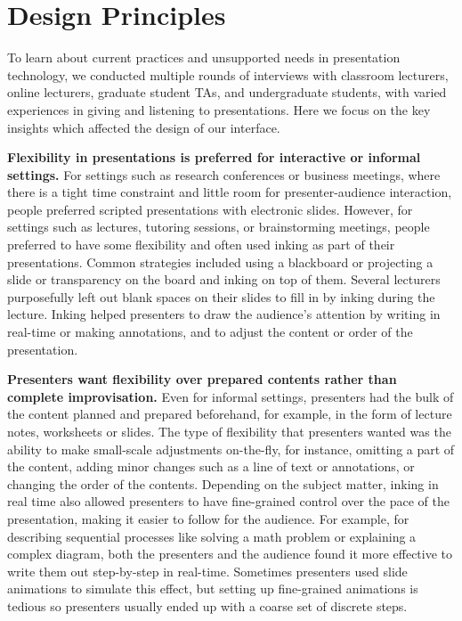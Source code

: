 \section{Design Principles}
To learn about current practices and unsupported needs in presentation technology, we conducted multiple rounds of interviews with classroom lecturers, online lecturers, graduate student TAs, and undergraduate students, with varied experiences in giving and listening to presentations.  Here we focus on the key insights which affected the design of our interface. 

\textbf{Flexibility in presentations is preferred for interactive or informal settings.} For settings such as research conferences or business meetings, where there is a tight time constraint and little room for presenter-audience interaction, people preferred scripted presentations with electronic slides. However, for settings such as lectures, tutoring sessions, or brainstorming meetings, people preferred to have some flexibility and often used inking as part of their presentations. Common strategies included using a blackboard or projecting a slide or transparency on the board and inking on top of them. Several lecturers purposefully left out blank spaces on their slides to fill in by inking during the lecture. Inking helped presenters to draw the audience's attention by  writing in real-time or making annotations, and to adjust the content or order of the presentation. 

\textbf{Presenters want flexibility over prepared contents rather than complete improvisation.} Even for informal settings, presenters had the bulk of the content planned and prepared beforehand, for example, in the form of lecture notes, worksheets or slides. The type of flexibility that presenters wanted was the ability to make small-scale adjustments on-the-fly, for instance, omitting a part of the content, adding minor changes such as a line of text or annotations, or changing the order of the contents. Depending on the subject matter, inking in real time also allowed presenters to have fine-grained control over the pace of the presentation, making it easier to follow for the audience. For example, for describing sequential processes like solving a math problem or explaining a complex diagram, both the presenters and the audience found it more effective to write them out step-by-step in real-time. Sometimes presenters used slide animations to simulate this effect, but setting up fine-grained animations is tedious so presenters usually ended up with a coarse set of discrete steps. 

